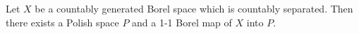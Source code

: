 Let $X$ be a countably generated Borel space which is countably separated. Then there exists a Polish space $P$ and a 1-1 Borel map of $X$ into $P$.
